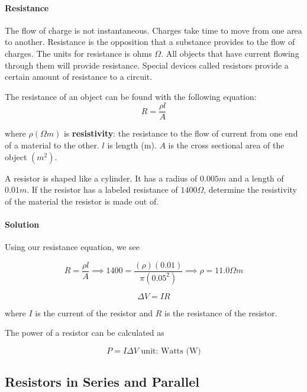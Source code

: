 \documentclass{scrartcl}
\theoremstyle{definition}
\begin{document}
	\paragraph{Resistance} The flow of charge is not instantaneous. Charges take time to move from one area to another. Resistance is the opposition that a substance provides to the flow of charges. The units for resistance is ohms $\Omega$. All objects that have current flowing through them will provide resistance. Special devices called resistors provide a certain amount of resistance to a circuit. 
	
	\begin{theorem}[Resistance]
		The resistance of an object can be found with the following equation:
		$$
		R = \frac{\rho l}{A}
		$$
		
		\noindent where $\rho (\Omega m)$ is \textbf{resistivity}: the resistance to the flow of current from one end of a material to the other. $l$ is length (m). $A$ is the cross sectional area of the object $(m^2)$. 
	\end{theorem}
	
	\begin{example}
		A resistor is shaped like a cylinder. It has a radius of $0.005m$ and a length of $0.01m$. If the resistor has a labeled resistance of $1400 \Omega$, determine the resistivity of the material the resistor is made out of. 
	\end{example}
	
	\paragraph{Solution} Using our resistance equation, we see
	
	$$
	R = \frac{\rho l}{A} \implies 1400 = \frac{(\rho)(0.01)}{\pi (0.05^2)} \implies \boxed{\rho = 11.0 \Omega m }
	$$
	
	\begin{theorem}
		$$\Delta V = IR$$
		
		\noindent where $I$ is the current of the resistor and $R$ is the resistance of the resistor.
	\end{theorem}
	
	\begin{theorem}
		The power of a resistor can be calculated as
		
		$$
		P = I \Delta V \text{ unit: Watts (W)}
		$$
	\end{theorem}
	
	\subsection{Resistors in Series and Parallel}
	
\end{document}
